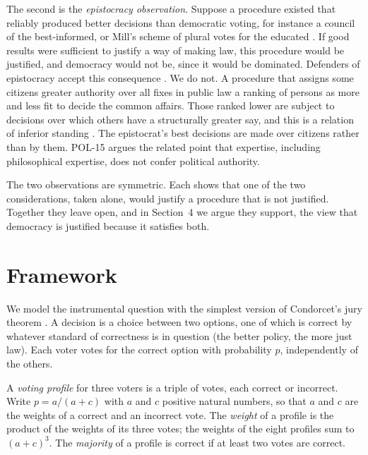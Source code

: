 \documentclass{situationist-preprint}
\begin{document}
The second is the \emph{epistocracy observation}. Suppose a procedure existed that reliably produced better decisions than democratic voting, for instance a council of the best-informed, or Mill's scheme of plural votes for the educated \citep[ch.~VIII]{MillCRG}. If good results were sufficient to justify a way of making law, this procedure would be justified, and democracy would not be, since it would be dominated. Defenders of epistocracy accept this consequence \citep{Brennan2016}. We do not. A procedure that assigns some citizens greater authority over all fixes in public law a ranking of persons as more and less fit to decide the common affairs. Those ranked lower are subject to decisions over which others have a structurally greater say, and this is a relation of inferior standing \citep{Kolodny2014b}. The epistocrat's best decisions are made over citizens rather than by them. POL-15 argues the related point that expertise, including philosophical expertise, does not confer political authority.

The two observations are symmetric. Each shows that one of the two considerations, taken alone, would justify a procedure that is not justified. Together they leave open, and in Section~4 we argue they support, the view that democracy is justified because it satisfies both.

\section{Framework}

We model the instrumental question with the simplest version of Condorcet's jury theorem \citep{Condorcet1785}. A decision is a choice between two options, one of which is correct by whatever standard of correctness is in question (the better policy, the more just law). Each voter votes for the correct option with probability $p$, independently of the others.

\begin{definition}\label{d:profile}
A \emph{voting profile} for three voters is a triple of votes, each correct or incorrect. Write $p = a/(a+c)$ with $a$ and $c$ positive natural numbers, so that $a$ and $c$ are the weights of a correct and an incorrect vote. The \emph{weight} of a profile is the product of the weights of its three votes; the weights of the eight profiles sum to $(a+c)^3$. The \emph{majority} of a profile is correct if at least two votes are correct.
\end{definition}
\end{document}
